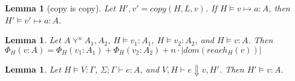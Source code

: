 \documentclass{easychair}
\newtheorem{lemma}[theorem]{Lemma}
\theoremstyle{definition}
\begin{document}
\begin{lemma}[copy is copy]
	Let $H',v' = copy(H,L,v)$. If $H \vDash v \mapsto a : A$, then $H' \vDash v' \mapsto a : A$.
\end{lemma}

\begin{lemma}\label{itm:shareSize}
	Let $A \curlyvee^n A_1,A_2$, $H \vDash v_1 : A_1$, $H \vDash v_2 : A_2$, 
	and $H \vDash v : A$. Then $\Phi_{H}(v : A) = 
	\Phi_{H}(v_1 : A_1) + \Phi_{H}(v_2 : A_2) + n\cdot |dom(reach_H(v))|$
\end{lemma}

\begin{lemma}\label{itm:wellFormed}
	Let $H \vDash V : \Gamma$, $\Sigma;\Gamma \vdash e : A$, and $V,H \vdash e \Downarrow v,H'$. Then 
	$H' \vDash v : A$.
\end{lemma}
\end{document}
